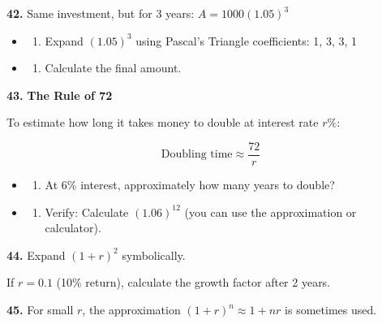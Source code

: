 \documentclass[
  11pt,
]{article}
\providecommand{\tightlist}{%
  \setlength{\itemsep}{0pt}\setlength{\parskip}{0pt}}
\begin{document}
\textbf{42.} Same investment, but for 3 years: \(A = 1000(1.05)^3\)

\begin{itemize}
\item
  \begin{enumerate}
  \def\labelenumi{(\alph{enumi})}
  \tightlist
  \item
    Expand \((1.05)^3\) using Pascal's Triangle coefficients: 1, 3, 3, 1
  \end{enumerate}
\item
  \begin{enumerate}
  \def\labelenumi{(\alph{enumi})}
  \setcounter{enumi}{1}
  \tightlist
  \item
    Calculate the final amount.
  \end{enumerate}
\end{itemize}

\textbf{43.} \textbf{The Rule of 72}

To estimate how long it takes money to double at interest rate \(r\%\):

\[\text{Doubling time} \approx \frac{72}{r}\]

\begin{itemize}
\item
  \begin{enumerate}
  \def\labelenumi{(\alph{enumi})}
  \tightlist
  \item
    At 6\% interest, approximately how many years to double?
  \end{enumerate}
\item
  \begin{enumerate}
  \def\labelenumi{(\alph{enumi})}
  \setcounter{enumi}{1}
  \tightlist
  \item
    Verify: Calculate \((1.06)^{12}\) (you can use the approximation or
    calculator).
  \end{enumerate}
\end{itemize}

\textbf{44.} Expand \((1 + r)^2\) symbolically.

If \(r = 0.1\) (10\% return), calculate the growth factor after 2 years.

\textbf{45.} For small \(r\), the approximation
\((1 + r)^n \approx 1 + nr\) is sometimes used.
\end{document}
